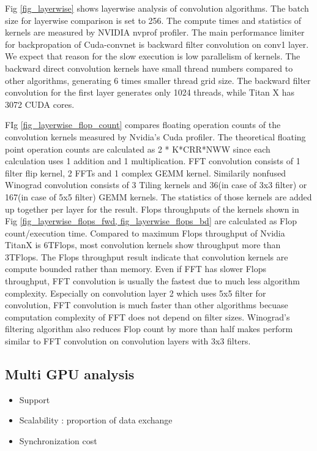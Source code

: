 Fig \ref{fig_layerwise} shows layerwise analysis of convolution algorithms.
The batch size for layerwise comparison is set to 256.
The compute times and statistics of kernels are measured by NVIDIA nvprof profiler.
The main performance limiter for backpropation of Cuda-convnet is backward filter convolution on conv1 layer.
We expect that reason for the slow execution is low parallelism of kernels.
The backward direct convolution kernels have small thread numbers compared to other algorithms, generating 6 times smaller thread grid size.
The backward filter convolution for the first layer generates only 1024 threads, while Titan X has 3072 CUDA cores.

FIg \ref{fig_layerwise_flop_count} compares floating operation counts of the convolution kernels measured by Nvidia's Cuda profiler.
The theoretical floating point operation counts are calculated as 2 * K*CRR*NWW since each calculation uses 1 addition and 1 multiplication.
FFT convolution consists of 1 filter flip kernel, 2 FFTs and 1 complex GEMM kernel.
Similarily nonfused Winograd convolution consists of 3 Tiling kernels and 36(in case of 3x3 filter) or 167(in case of 5x5 filter) GEMM kernels.
The statistics of those kernels are added up together per layer for the result.
Flops throughputs of the kernels shown in Fig \ref{fig_layerwise_flops_fwd, fig_layerwise_flops_bd} are calculated as Flop count/execution time.
Compared to maximum Flops throughput of Nvidia TitanX is 6TFlops, most convolution kernels show throughput more than 3TFlops.
The Flops throughput result indicate that convolution kernels are compute bounded rather than memory.
Even if FFT has slower Flops throughput, FFT convolution is usually the fastest due to much less algorithm complexity.
Especially on convolution layer 2 which uses 5x5 filter for convolution, FFT convolution is much faster than other algorithms becuase computation complexity of FFT does not depend on filter sizes.
Winograd's filtering algorithm also reduces Flop count by more than half makes perform similar to FFT convolution on convolution layers with 3x3 filters.

\subsection{Multi GPU analysis}

\begin{itemize}
  \item Support
  \item Scalability : proportion of data exchange
  \item Synchronization cost
\end{itemize}

